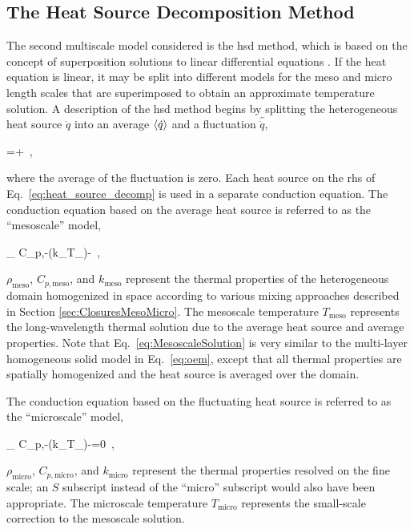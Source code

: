 \subsection{The Heat Source Decomposition Method}

The second multiscale model considered is the \gls{hsd} method, which is based on the concept of superposition solutions to linear differential equations \cite{stainsby}. If the heat equation is linear, it may be split into different models for the meso and micro length scales that are superimposed to obtain an approximate temperature solution. A description of the \gls{hsd} method begins by splitting the heterogeneous heat source \(\dot{q}\) into an average \(\langle\dot{q}\rangle\) and a fluctuation \(\hat{\dot{q}}\),

\beq
\label{eq:heat_source_decomp}
=\la{}\ra+\ ,
\eeq

\noindent where the average of the fluctuation is zero. Each heat source on the \gls{rhs} of Eq.\ \eqref{eq:heat_source_decomp} is used in a separate conduction equation. The conduction equation based on the average heat source is referred to as the ``mesoscale'' model,

\beq
\label{eq:MesoscaleSolution}
\rho_ C_{p,}-\nabla\cdot(k_\nabla T_)-\la{}\ ,
\eeq

\noindent \(\rho_\text{meso}\), \(C_{p,\text{meso}}\), and \(k_\text{meso}\) represent the thermal properties of the heterogeneous domain homogenized in space according to various mixing approaches described in Section \ref{sec:ClosuresMesoMicro}. The mesoscale temperature \(T_\text{meso}\) represents the long-wavelength thermal solution due to the average heat source and average properties. Note that Eq.\ \eqref{eq:MesoscaleSolution} is very similar to the multi-layer homogeneous solid model in Eq.\ \eqref{eq:oem}, except that all thermal properties are spatially homogenized and the heat source is averaged over the domain.

The conduction equation based on the fluctuating heat source is referred to as the ``microscale'' model,

\beq
\label{eq:MicroscaleSolution}
\rho_ C_{p,}-\nabla\cdot(k_\nabla T_)-=0\ ,
\eeq

\noindent \(\rho_\text{micro}\), \(C_{p,\text{micro}}\), and \(k_\text{micro}\) represent the thermal properties resolved on the fine scale; an \(S\) subscript instead of the ``micro'' subscript would also have been appropriate. The microscale temperature \(T_\text{micro}\) represents the small-scale correction to the mesoscale solution.

